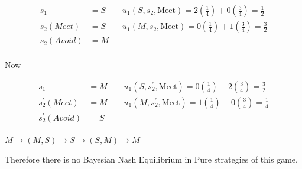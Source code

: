 \documentclass[12pt,a4paper]{article}
\begin{document}
 \begin{align*}
    s_{1}&=S \qquad u_{1}(S,s_{2},\text{Meet})=2\left( \frac{1}{4} \right) + 0 \left( \frac{3}{4} \right) = \frac{1}{2}\\
    s_{2}(Meet)&=S \qquad u_{1}(M,s_{2},\text{Meet})=0\left( \frac{1}{4} \right) + 1 \left( \frac{3}{4} \right) = \frac{3}{2} \\
    s_{2}(Avoid)&=M\\
\end{align*}

Now

 \begin{align*}
    s_{1}&=M \qquad u_{1}(S,s_{2}^{'},\text{Meet})=0\left( \frac{1}{4} \right) + 2 \left( \frac{3}{4} \right) = \frac{3}{2}\\
    s_{2}^{'}(Meet)&=M \qquad u_{1}(M,s_{2}^{'},\text{Meet})=1\left( \frac{1}{4} \right) + 0 \left( \frac{3}{4} \right) = \frac{1}{4} \\
    s_{2}^{'}(Avoid)&=S\\  
\end{align*}

\(M \to (M,S) \to S \to (S,M) \to M\) 

Therefore there is no Bayesian Nash Equilibrium in Pure strategies of this game. 
\end{document}
